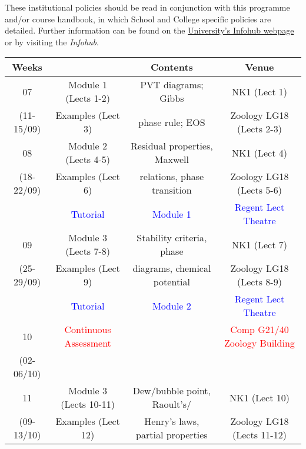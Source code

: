 \documentclass[12pts,a4paper,amsmath,amssymb,floatfix]{article}%
\newcommand{\red}{\textcolor{red}}
\newcommand{\blue}{\textcolor{blue}}
\begin{document}
These institutional policies should be read in conjunction with this programme and/or course handbook, in which School and College specific policies are detailed. Further information can be found on the \href{http:www.abdn.ac.uk/infohub/}{University's Infohub webpage} or by visiting the {\it Infohub}.


\begin{table}
  \begin{center}
    \begin{tabular}{c | c c | c}
      \hline
          {\bf Weeks}   &                          &    {\bf Contents}     &            {\bf Venue}               \\
      \hline
             07         &   Module 1 (Lects 1-2)   &  PVT diagrams; Gibbs  &            NK1  (Lect 1)             \\ 
         (11-15/09)     &   Examples (Lect 3)      &  phase rule; EOS      &            Zoology LG18 (Lects 2-3)  \\
      \hline       
             08         &   Module 2 (Lects 4-5)   &Residual properties, Maxwell &      NK1  (Lect 4)             \\ 
         (18-22/09)     &   Examples (Lect 6)      &relations, phase transition  &      Zoology LG18 (Lects 5-6)  \\
                        &   \blue{Tutorial}        &  \blue{Module 1}      &            \blue{Regent Lect Theatre}\\
      \hline       
             09         &   Module 3 (Lects 7-8)   &Stability criteria, phase&            NK1  (Lect 7)             \\ 
         (25-29/09)     &   Examples (Lect 9)      &diagrams, chemical potential&      Zoology LG18 (Lects 8-9)  \\
                        &   \blue{Tutorial}        &  \blue{Module 2}      &            \blue{Regent Lect Theatre}\\
      \hline       
             10         & \red{Continuous Assessment}&                     &    \red{Comp G21/40 Zoology Building}\\ 
         (02-06/10)     &                          &                       &                                      \\
      \hline       
             11         &   Module 3 (Lects 10-11) &Dew/bubble point, Raoult's/&        NK1  (Lect 10)            \\ 
         (09-13/10)     &   Examples (Lect 12)     &Henry's laws, partial properties &  Zoology LG18 (Lects 11-12)\\

\end{tabular}
\end{center}
\end{table}
\end{document}
